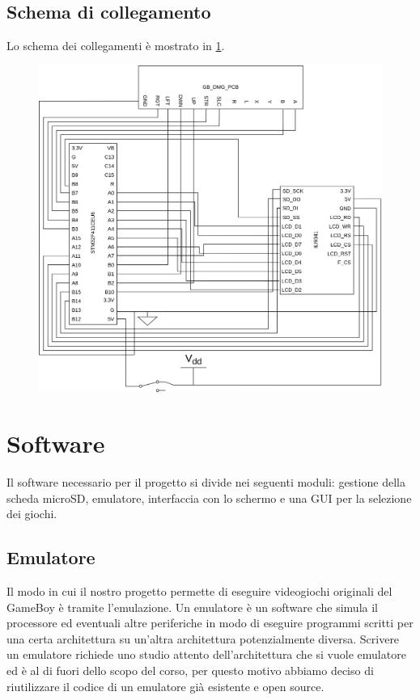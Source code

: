 \documentclass[hidelinks,12pt]{article}
\begin{document}
\subsection{Schema di collegamento}
Lo schema dei collegamenti è mostrato in \cref{fig:schema}.
\begin{figure}[h]
	\begin{center}
		\includegraphics[scale=0.65]{figures/scheme.png}
		\caption{}
		\label{fig:schema}
	\end{center}
\end{figure}

\section{Software}
Il software necessario per il progetto si divide nei seguenti moduli: gestione
della scheda microSD, emulatore, interfaccia con lo schermo e una GUI per la
selezione dei giochi.

\subsection{Emulatore}
Il modo in cui il nostro progetto permette di eseguire videogiochi originali
del GameBoy è tramite l'emulazione. Un emulatore è un software che simula il
processore ed eventuali altre periferiche in modo di eseguire
programmi scritti per una certa architettura su un'altra architettura
potenzialmente diversa.
Scrivere un emulatore richiede uno studio attento dell'architettura che si
vuole emulatore ed è al di fuori dello scopo del corso, per questo motivo
abbiamo deciso di riutilizzare il codice di un emulatore già esistente e
open source.
\end{document}
